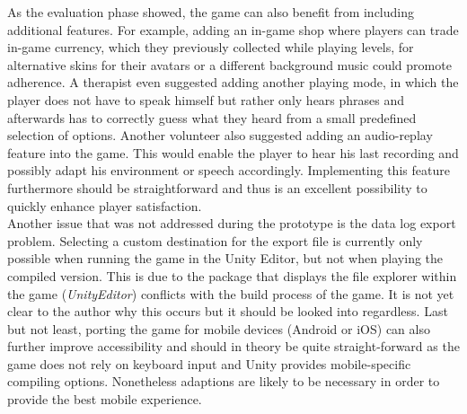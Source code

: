 \documentclass[draft,final]{vutinfth} %
\begin{document}
As the evaluation phase showed, the game can also benefit from including additional features. For example, adding an in-game shop where players can trade in-game currency, which they previously collected while playing levels, for alternative skins for their avatars or a different background music could promote adherence. A therapist even suggested adding another playing mode, in which the player does not have to speak himself but rather only hears phrases and afterwards has to correctly guess what they heard from a small predefined selection of options. Another volunteer also suggested adding an audio-replay feature into the game. This would enable the player to hear his last recording and possibly adapt his environment or speech accordingly. Implementing this feature furthermore should be straightforward and thus is an excellent possibility to quickly enhance player satisfaction.\\

Another issue that was not addressed during the prototype is the data log export problem. Selecting a custom destination for the export file is currently only possible when running the game in the Unity Editor, but not when playing the compiled version. This is due to the package that displays the file explorer within the game (\emph{UnityEditor}) conflicts with the build process of the game. It is not yet clear to the author why this occurs but it should be looked into regardless. Last but not least, porting the game for mobile devices (Android or iOS) can also further improve accessibility and should in theory be quite straight-forward as the game does not rely on keyboard input and Unity provides mobile-specific compiling options. Nonetheless adaptions are likely to be necessary in order to provide the best mobile experience.

\backmatter

\listoffigures %

\cleardoublepage %
\listoftables %


\end{document}
